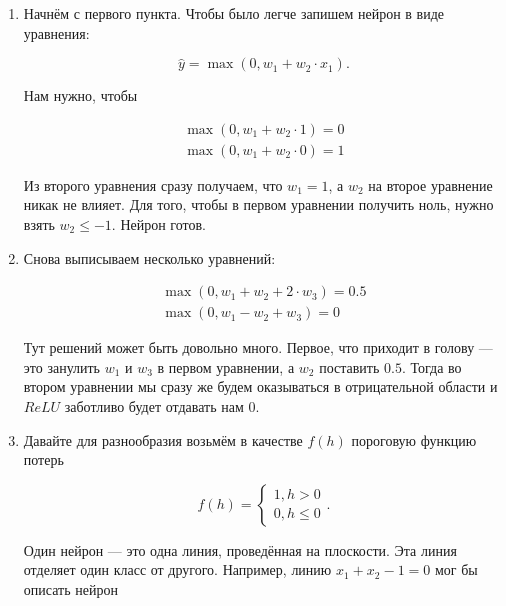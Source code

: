 \documentclass[12pt, a4paper, oneside]{article}
\theoremstyle{plain} %
\theoremstyle{definition}
\begin{document}
\begin{sol}
\begin{enumerate}
\item Начнём с первого пункта. Чтобы было легче запишем нейрон в виде уравнения: 

$$
\hat y = \max(0, w_1 + w_2 \cdot x_1).
$$

Нам нужно, чтобы 

\begin{equation*}
\begin{aligned}
\max(0, w_1 + w_2 \cdot 1) = 0 \\ 
\max(0, w_1 + w_2 \cdot 0) = 1 
\end{aligned}
\end{equation*}

Из второго уравнения сразу получаем, что $w_1 = 1$, а $w_2$ на второе уравнение никак не влияет. Для того, чтобы в первом уравнении получить ноль, нужно взять $w_2 \le -1$. Нейрон готов. 

\item Снова выписываем несколько уравнений: 

\begin{equation*}
\begin{aligned}
\max(0, w_1 + w_2 + 2 \cdot w_3) = 0.5 \\ 
\max(0, w_1 - w_2 + w_3) = 0 
\end{aligned}
\end{equation*}

Тут решений может быть довольно много. Первое, что приходит в голову --- это занулить $w_1$ и $w_3$ в первом уравнении, а $w_2$ поставить $0.5$. Тогда во втором уравнении мы сразу же будем оказываться в отрицательной области и $ReLU$ заботливо будет отдавать нам $0$. 

\item Давайте для разнообразия возьмём в качестве $f(h)$ пороговую функцию потерь

$$
f(h) = \begin{cases} 1, h > 0 \\ 0, h \le 0 \end{cases}.
$$

Один нейрон --- это одна линия, проведённая на плоскости. Эта линия отделяет один класс от другого. Например, линию $ x_1 + x_2 - 1 = 0 $ мог бы описать нейрон 

\begin{minipage}{0.49\linewidth}
\begin{center}
\end{center}
\end{minipage}
\end{enumerate}
\end{sol}
\end{document}
